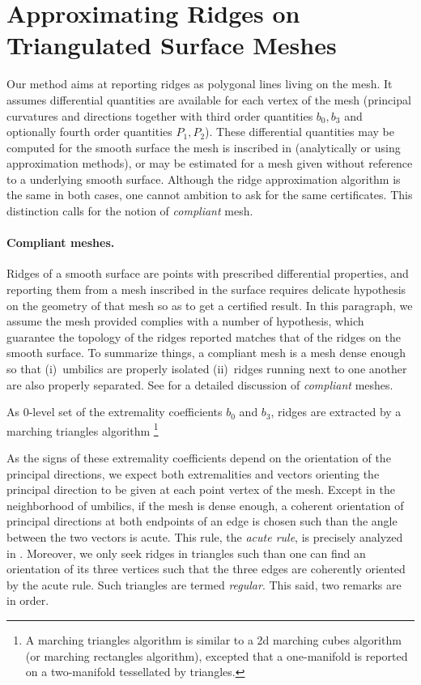 \section{Approximating  Ridges on Triangulated Surface Meshes}
\label{ridge-mesh}

Our method aims at reporting ridges as polygonal lines living on the
mesh. It assumes differential quantities are available for each vertex
of the mesh (principal curvatures and directions together with third
order quantities $b_0, b_3$ and optionally fourth order quantities
$P_1, P_2$). These differential quantities may be computed for the
smooth surface the mesh is inscribed in (analytically or using
approximation methods), or may be estimated for a mesh given without
reference to a underlying smooth surface. Although the ridge
approximation algorithm is the same in both cases, one cannot ambition
to ask for the same certificates.  This distinction calls for the
notion of {\em compliant} mesh.


\paragraph{Compliant meshes.}
Ridges of a smooth surface are points with prescribed differential
properties, and reporting them from a mesh inscribed in the surface
requires delicate hypothesis on the geometry of that mesh so as to get
a certified result. In this paragraph, we assume the mesh provided
complies with a number of hypothesis, which guarantee the topology of
the ridges reported matches that of the ridges on the smooth
surface. To summarize things, a compliant mesh is a mesh dense enough
so that (i)\ umbilics are properly isolated (ii)\ ridges running next
to one another are also properly separated.
See \cite{cgal:cp-tdare-05} for a detailed discussion of {\em
compliant} meshes.  \medskip

As 0-level set of the extremality coefficients $b_0$ and $b_3$, ridges
are extracted by a marching triangles algorithm \footnote{A marching
triangles algorithm is similar to a 2d marching cubes algorithm (or
marching rectangles algorithm), excepted that a one-manifold is
reported on a two-manifold tessellated by triangles.}

As the signs of these extremality coefficients depend on the
orientation of the principal directions, we expect both extremalities
and vectors orienting the principal direction to be given at each
point vertex of the mesh. Except in the neighborhood of umbilics, if
the mesh is dense enough, a coherent orientation of principal
directions at both endpoints of an edge is chosen such than the angle
between the two vectors is acute. This rule, the {\em acute rule}, is
precisely analyzed in \cite{cgal:cp-tdare-05}.
Moreover, we only seek ridges in triangles such than one can find an
orientation of its three vertices such that the three edges are
coherently oriented by the acute rule. Such triangles are termed
{\em regular}. This said, two remarks are in order.

